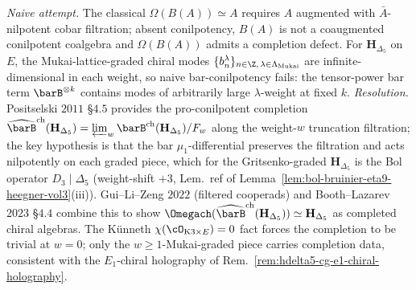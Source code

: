 \begin{proposition}
\label{prop:hochcalc-hdelta5-inversion-II}
\emph{Naive attempt.} The classical $\Omega(B(A))\simeq A$ requires $A$
augmented with $\bar A$-nilpotent cobar filtration; absent
conilpotency, $B(A)$ is not a coaugmented conilpotent coalgebra
and $\Omega(B(A))$ admits a completion defect. For
$\mathbf H_{\Delta_5}$ on $E$, the Mukai-lattice-graded chiral
modes $\{b_n^\lambda\}_{n\in\Z,\,\lambda\in\Lambda_{\mathrm{Mukai}}}$
are infinite-dimensional in each weight, so naive bar-conilpotency
fails: the tensor-power bar term $\barB^{\otimes k}$ contains
modes of arbitrarily large $\lambda$-weight at fixed $k$. \emph{Resolution.}
Positselski $2011$ \S$4.5$ provides the pro-conilpotent completion
$\widehat\barB^{\mathrm{ch}}(\mathbf H_{\Delta_5})
=\varprojlim_{w}\barB^{\mathrm{ch}}(\mathbf H_{\Delta_5})/F_w$
along the weight-$w$ truncation filtration; the key hypothesis is
that the bar $\mu_1$-differential preserves the filtration and
acts nilpotently on each graded piece, which for the
Gritsenko-graded $\mathbf H_{\Delta_5}$ is the Bol operator
$D_3\mid\Delta_5$ (weight-shift $+3$, Lem.~ref of
Lemma~\ref{lem:bol-bruinier-eta9-heegner-vol3}(iii)). Gui--Li--Zeng
$2022$ (filtered cooperads) and Booth--Lazarev $2023$ \S$4.4$
combine this to show $\Omegach(\widehat\barB^{\mathrm{ch}}(\mathbf
H_{\Delta_5}))\simeq\mathbf H_{\Delta_5}$ as completed chiral
algebras. The K\"unneth $\chi(\cO_{\mathrm K3\times E})=0$ fact
forces the completion to be trivial at $w=0$; only the
$w\ge 1$-Mukai-graded piece carries completion data, consistent
with the $E_1$-chiral holography of
Rem.~\ref{rem:hdelta5-cg-e1-chiral-holography}.
\end{proposition}

